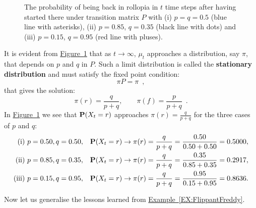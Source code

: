 {\begin{example}
\begin{figure}[htpb]
\caption{The probability of being back in rollopia in $t$ time steps after having started there under transition matrix $P$ with (i) $p=q=0.5$ (blue line with asterisks), (ii) $p=0.85$, $q=0.35$ (black line with dots) and (iii) $p=0.15$, $q=0.95$ (red line with pluses).\label{F:FlippantFreddyRollopiaProbs}}
\centering   {}
\end{figure}

It is evident from \hyperref[F:FlippantFreddyRollopiaProbs]{Figure~\ref*{F:FlippantFreddyRollopiaProbs}} that as $t \to \infty$, $\mu_t$ approaches a distribution, say $\pi$, that depends on $p$ and $q$ in $P$.  Such a limit distribution is called the {\bf stationary distribution} and must satisfy the fixed point condition:
\[
\pi P = \pi \enspace ,
\]
that gives the solution:
\[
\pi(r) = \frac{q}{p+q}, \qquad \pi(f) = \frac{p}{p+q} \enspace .
\]
In \hyperref[F:FlippantFreddyRollopiaProbs]{Figure~\ref*{F:FlippantFreddyRollopiaProbs}} we see that $\mathbf{P}(X_t=r)$ approaches $\pi(r) = \frac{q}{p+q}$ for the three cases of $p$ and $q$:
\begin{align*}
\text{(i)}& \ p=0.50, q=0.50, & \mathbf{P}(X_t=r) & \to \pi(r) = \frac{q}{p+q} =  \frac{0.50}{0.50+0.50} = 0.5000,\\
\text{(ii)}& \  p=0.85, q=0.35, & \mathbf{P}(X_t=r) & \to \pi(r) = \frac{q}{p+q} =  \frac{0.35}{0.85+0.35} = 0.2917, \\
\text{(iii)}& \ p=0.15, q=0.95, & \mathbf{P}(X_t=r) & \to \pi(r) = \frac{q}{p+q} = \frac{0.95}{0.15+0.95} = 0.8636.
\end{align*}
\end{example}

Now let us generalise the lessons learned from \hyperref[EX:FlippantFreddy]{Example~\ref*{EX:FlippantFreddy}}.

}
